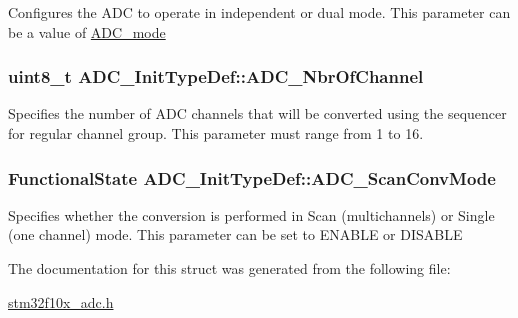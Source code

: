 \label{structADC__InitTypeDef_a0f9ec17ad585d66a54625213062c9260}
Configures the ADC to operate in independent or dual mode. This parameter can be a value of \hyperlink{group__ADC__mode}{ADC\_\-mode} \hypertarget{structADC__InitTypeDef_ad6f39a12ac32a2767085ac94e9338bc3}{
\subsubsection[{ADC\_\-NbrOfChannel}]{\setlength{\rightskip}{0pt plus 5cm}uint8\_\-t {\bf ADC\_\-InitTypeDef::ADC\_\-NbrOfChannel}}}
\label{structADC__InitTypeDef_ad6f39a12ac32a2767085ac94e9338bc3}
Specifies the number of ADC channels that will be converted using the sequencer for regular channel group. This parameter must range from 1 to 16. \hypertarget{structADC__InitTypeDef_aaf44f54f22ab40bf8fae01f075aa4c87}{
\subsubsection[{ADC\_\-ScanConvMode}]{\setlength{\rightskip}{0pt plus 5cm}FunctionalState {\bf ADC\_\-InitTypeDef::ADC\_\-ScanConvMode}}}
\label{structADC__InitTypeDef_aaf44f54f22ab40bf8fae01f075aa4c87}
Specifies whether the conversion is performed in Scan (multichannels) or Single (one channel) mode. This parameter can be set to ENABLE or DISABLE 

The documentation for this struct was generated from the following file:\begin{DoxyCompactItemize}
\item 
\hyperlink{stm32f10x__adc_8h}{stm32f10x\_\-adc.h}\end{DoxyCompactItemize}
